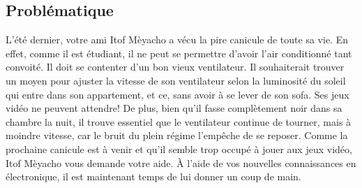 \documentclass[english,french,12pt]{article}
\begin{document}

\vspace{-1em}
\subsection*{Problématique}
L’été dernier, votre ami Itof Mèyacho a vécu la pire canicule de toute sa vie. En effet, comme il est étudiant, il ne peut se permettre d’avoir l’air conditionné tant convoité. Il doit se contenter d’un bon vieux ventilateur. Il souhaiterait trouver un moyen pour ajuster la vitesse de son ventilateur selon la luminosité du soleil qui entre dans son appartement, et ce, sans avoir à se lever de son sofa. Ses jeux vidéo ne peuvent attendre! De plus, bien qu’il fasse complètement noir dans sa chambre la nuit, il trouve essentiel que le ventilateur continue de tourner, mais à moindre vitesse, car le bruit du plein régime l’empêche de se reposer. Comme la prochaine canicule est à venir et qu’il semble trop occupé à jouer aux jeux vidéo, Itof Mèyacho vous demande votre aide. À l'aide de vos nouvelles connaissances en électronique, il est maintenant temps de lui donner un coup de main.
\end{document}
